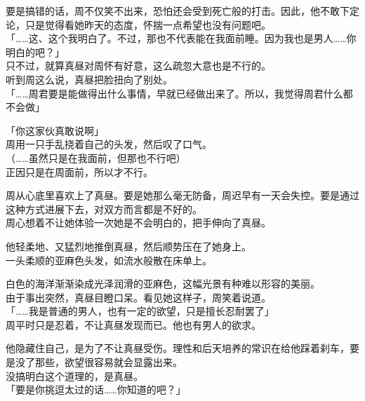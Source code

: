 要是搞错的话，周不仅笑不出来，恐怕还会受到死亡般的打击。因此，他不敢下定论，只是觉得看她昨天的态度，怀揣一点希望也没有问题吧。\\

「……这、这个我明白了。不过，那也不代表能在我面前睡。因为我也是男人……你明白的吧？」\\

只不过，就算真昼对周怀有好意，这么疏忽大意也是不行的。\\

听到周这么说，真昼把脸扭向了别处。\\

「……周君要是能做得出什么事情，早就已经做出来了。所以，我觉得周君什么都不会做」

「你这家伙真敢说啊」\\

周用一只手乱挠着自己的头发，然后叹了口气。\\

（……虽然只是在我面前，但那也不行吧）\\

正因只是在周面前，所以才不行。

周从心底里喜欢上了真昼。要是她那么毫无防备，周迟早有一天会失控。要是通过这种方式进展下去，对双方而言都是不好的。\\

周心想着不让她体验一次她是不会明白的，把手伸向了真昼。

他轻柔地、又猛烈地推倒真昼，然后顺势压在了她身上。\\

一头柔顺的亚麻色头发，如流水般散在床单上。

白色的海洋渐渐染成光泽润滑的亚麻色，这幅光景有种难以形容的美丽。\\

由于事出突然，真昼目瞪口呆。看见她这样子，周笑着说道。\\

「……我是普通的男人，也有一定的欲望，只是擅长忍耐罢了」\\

周平时只是忍着，不让真昼发现而已。他也有男人的欲求。

他隐藏住自己，是为了不让真昼受伤。理性和后天培养的常识在给他踩着刹车，要是没了那些，欲望很容易就会显露出来。\\

没搞明白这个道理的，是真昼。\\

「要是你挑逗太过的话……你知道的吧？」\\

